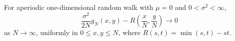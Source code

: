For aperiodic one-dimensional random walk with \(\mu = 0\) and \(0 < \sigma^2 < \infty\),
\[
\frac{\sigma^2}{2N} g_N(x,y) - R\!\left(\frac{x}{N}, \frac{y}{N}\right) \to 0
\]
as \(N \to \infty\), uniformly in \(0 \leq x, y \leq N\), where \(R(s,t) = \min(s,t) - st\).
